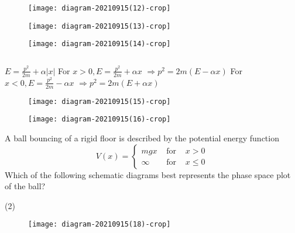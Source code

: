 \begin{enumerate}
\begin{tasks}
\begin{figure}[H]
	\end{figure}
	\task[\textbf{B.}]\begin{figure}[H]
		\centering
		\texttt{[image: diagram-20210915(12)-crop]}
	\end{figure}
	\task[\textbf{C.}]\begin{figure}[H]
		\centering
		\texttt{[image: diagram-20210915(13)-crop]}
	\end{figure}
	\task[\textbf{D.}]\begin{figure}[H]
		\centering
		\texttt{[image: diagram-20210915(14)-crop]}
	\end{figure}
\end{tasks}
\begin{answer}$\left. \right. $\\
\begin{minipage}{0.5\textwidth}
 $E=\frac{p^{2}}{2 m}+\alpha|x|$
	For $x>0, E=\frac{p^{2}}{2 m}+\alpha x$ $\Rightarrow p^{2}=2 m(E-\alpha x)$
	For $x<0, E=\frac{p^{2}}{2 m}-\alpha x$ $\Rightarrow p^{2}=2 m(E+\alpha x)$
\end{minipage}
\begin{minipage}{0.5\textwidth}
\begin{figure}[H]
	\centering
	\texttt{[image: diagram-20210915(15)-crop]}
\end{figure}
\begin{figure}[H]
	\centering
	\texttt{[image: diagram-20210915(16)-crop]}
	\caption{}
	\label{}
\end{figure}
\end{minipage}	
\end{answer}
\begin{minipage}{\textwidth}
	\item A ball bouncing of a rigid floor is described by the potential energy function
	$$
	V(x)=\left\{\begin{array}{lll}
	m g x & \text { for } & x>0 \\
	\infty & \text { for } & x \leq 0
	\end{array}\right.
	$$
	Which of the following schematic diagrams best represents the phase space plot of the ball?
\end{minipage}
\begin{tasks}(2)
	\task[\textbf{A.}]\begin{figure}[H]
		\centering
		\texttt{[image: diagram-20210915(18)-crop]}
	\end{figure}

\end{tasks}
\end{enumerate}
